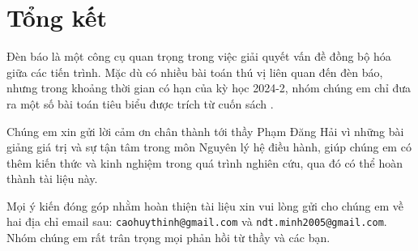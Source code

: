 \section{Tổng kết}
Đèn báo là một công cụ quan trọng trong việc giải quyết vấn đề đồng bộ hóa giữa các tiến trình. Mặc dù có nhiều bài toán thú vị liên quan đến đèn báo, nhưng trong khoảng thời gian có hạn của kỳ học 2024-2, nhóm chúng em chỉ đưa ra một số bài toán tiêu biểu được trích từ cuốn sách \cite{downey2008}.

Chúng em xin gửi lời cảm ơn chân thành tới thầy Phạm Đăng Hải vì những bài giảng giá trị và sự tận tâm trong môn Nguyên lý hệ điều hành, giúp chúng em có thêm kiến thức và kinh nghiệm trong quá trình nghiên cứu, qua đó có thể hoàn thành tài liệu này.

Mọi ý kiến đóng góp nhằm hoàn thiện tài liệu xin vui lòng gửi cho chúng em về hai địa chỉ email sau: \texttt{caohuythinh@gmail.com} và \texttt{ndt.minh2005@gmail.com}. Nhóm chúng em rất trân trọng mọi phản hồi từ thầy và các bạn.
